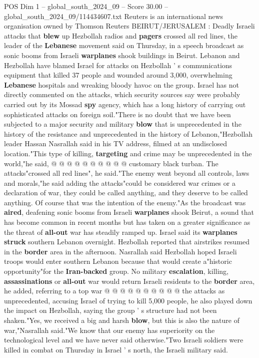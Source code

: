 \begin{textsample}{POS Dim 1 – global\_south\_2024\_09 – Score 30.00 – global\_south\_2024\_09/114434607.txt}  \label{ex:f1_pos_039}
Reuters is an international news organisation owned by Thomson Reuters BEIRUT/JERUSALEM : Deadly Israeli attacks that \textbf{blew} up Hezbollah radios and \textbf{pagers} crossed all red lines, the leader of the \textbf{Lebanese} movement said on Thursday, in a speech broadcast as sonic booms from Israeli \textbf{warplanes} shook buildings in Beirut.
Lebanon and Hezbollah have blamed Israel for attacks on Hezbollah ' s communications equipment that killed 37 people and wounded around 3,000, overwhelming \textbf{Lebanese} hospitals and wreaking bloody havoc on the group.
Israel has not directly commented on the attacks, which security sources say were probably carried out by its Mossad \textbf{spy} agency, which has a long history of carrying out sophisticated attacks on foreign soil."There is no doubt that we have been subjected to a major security and military \textbf{blow} that is unprecedented in the history of the resistance and unprecedented in the history of Lebanon,"Hezbollah leader Hassan Nasrallah said in his TV address, filmed at an undisclosed location."This type of killing, \textbf{targeting} and crime may be unprecedented in the world,"he said, @ @ @ @ @ @ @ @ @ @ customary black turban.
The attacks"crossed all red lines", he said."The enemy went beyond all controls, laws and morals,"he said adding the attacks"could be considered war crimes or a declaration of war, they could be called anything, and they deserve to be called anything.
Of course that was the intention of the enemy."As the broadcast was \textbf{aired}, deafening sonic booms from Israeli \textbf{warplanes} shook Beirut, a sound that has become common in recent months but has taken on a greater significance as the threat of \textbf{all-out} war has steadily ramped up.
Israel said its \textbf{warplanes} \textbf{struck} southern Lebanon overnight.
Hezbollah reported that airstrikes resumed in the \textbf{border} area in the afternoon.
Nasrallah said Hezbollah hoped Israeli troops would enter southern Lebanon because that would create a"historic opportunity"for the \textbf{Iran-backed} group.
No military \textbf{escalation}, killing, \textbf{assassinations} or \textbf{all-out} war would return Israeli residents to the \textbf{border} area, he added, referring to a top war @ @ @ @ @ @ @ @ @ @ the attacks as unprecedented, accusing Israel of trying to kill 5,000 people, he also played down the impact on Hezbollah, saying the group ' s structure had not been shaken."Yes, we received a big and harsh \textbf{blow}, but this is also the nature of war,"Nasrallah said."We know that our enemy has superiority on the technological level and we have never said otherwise."Two Israeli soldiers were killed in combat on Thursday in Israel ' s north, the Israeli military said.

\end{textsample}

